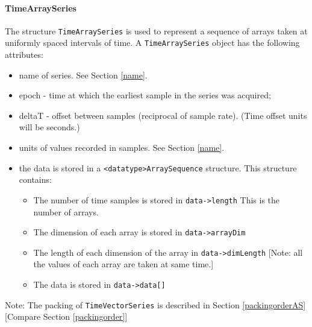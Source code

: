 \documentclass[]{ligodcc}
\renewcommand{\texttt}[1]{{\ttfamily\color{blue}#1}}
\begin{document}
\paragraph{{\texttt {TimeArraySeries}} \\}

The structure {\tt TimeArraySeries} is used to represent a sequence of
arrays taken at uniformly spaced intervals of time. A {\tt TimeArraySeries}
object has the following attributes:

\begin{itemize}
\vspace{-0.15in}
\item
name of series. See Section \ref{name}.
\vspace{-0.15in}
\item
epoch  -  time at which the earliest sample in the series was acquired;
\vspace{-0.15in}
\item
deltaT  - offset between samples (reciprocal of sample rate).  (Time
offset units will be seconds.)
\vspace{-0.15in}
\item
units of values recorded in samples. See Section \ref{name}.
\vspace{-0.15in}
\item
the data is stored in a {\tt <datatype>ArraySequence}  structure. This
structure contains:
\begin{itemize}
\vspace{-0.10in}
\item
The number of time samples is stored in {\tt data->length} This is the
number of arrays.
\vspace{-0.10in}
\item
The dimension of each array is stored in {\tt data->arrayDim}
\vspace{-0.10in}
\item
The length of each dimension of the array in {\tt data->dimLength}
[Note:  all the values of each array are taken at same time.]
\vspace{-0.10in}
\item
The data is stored in {\tt data->data[]}
\end{itemize}
\end{itemize}

Note: The packing of {\tt TimeVectorSeries} is described in Section
\ref{packingorderAS} [Compare Section \ref{packingorder}] 
\end{document}
